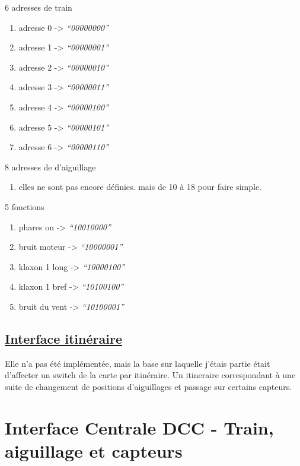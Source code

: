 6 adresses de train
\begin {enumerate}
\item adresse 0 -> \emph{``00000000''}  
\item adresse 1 -> \emph{``00000001''}
\item adresse 2 -> \emph{``00000010''}
\item adresse 3 -> \emph{``00000011''}
\item adresse 4 -> \emph{``00000100''}
\item adresse 5 -> \emph{``00000101''}
\item adresse 6 -> \emph{``00000110''}
\end {enumerate}  

\bigskip

8 adresses de d'aiguillage
\begin {enumerate}
\item elles ne sont pas encore définies. mais de 10 à 18 pour faire simple.
\end {enumerate}  

\bigskip

5 fonctions
\begin {enumerate}
\item phares on     -> \emph{``10010000''}
\item bruit moteur  -> \emph{``10000001''}
\item klaxon 1 long -> \emph{``10000100''}
\item klaxon 1 bref -> \emph{``10100100''}
\item bruit du vent -> \emph{``10100001''}
\end {enumerate}  

\bigskip

\subsection{\underline{Interface itinéraire}}
\label{sec:ihm_iti}

Elle n'a pas été implémentée, mais la base sur laquelle j'étais partie
\'etait d'affecter un switch de la carte par itinéraire.
Un itineraire correspondant à une suite de changement de positions
d'aiguillages et passage sur certains capteurs.

\newpage

\section{Interface Centrale DCC - Train, aiguillage et capteurs}
\label{sec:int_dcc}

